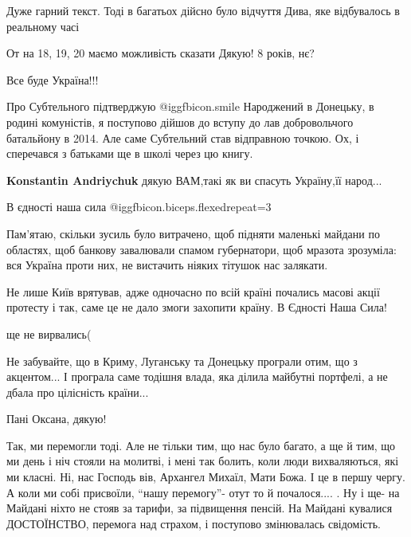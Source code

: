 \begin{itemize}
Дуже гарний текст.
Тоді в багатьох дійсно було відчуття Дива, яке відбувалось в реальному часі

От на 18, 19, 20 маємо можливість сказати Дякую! 8 років, нє?

Все буде Україна!!!


Про Субтельного підтверджую  @igg{fbicon.smile}  Народжений в Донецьку, в родині комуністів, я
поступово дійшов до вступу до лав добровольчого батальйону в 2014. Але саме
Субтельний став відправною точкою. Ох, і сперечався з батьками ще в школі через
цю книгу.

\textbf{Konstantin Andriychuk} дякую ВАМ,такі як ви спасуть Україну,її народ...

В єдності наша сила @igg{fbicon.biceps.flexed}{repeat=3} 


Пам'ятаю, скільки зусиль було витрачено, щоб підняти маленькі майдани по
областях, щоб банкову завалювали спамом губернатори, щоб мразота зрозуміла: вся
Україна проти них, не вистачить ніяких тітушок нас залякати.


Не лише Київ врятував, адже одночасно по всій країні почались масові акції
протесту і так, саме це не дало змоги захопити країну. В Єдності Наша Сила!

ще не вирвались(


Не забувайте, що в Криму, Луганську та Донецьку програли отим, що з акцентом...
І програла саме тодішня влада, яка ділила майбутні портфелі, а не дбала про
цілісність країни...

Пані Оксана, дякую!


Так, ми перемогли тоді. Але не тільки тим, що нас було багато, а ще й тим, що
ми день і ніч стояли на молитві, і мені так болить, коли люди вихваляються, які
ми класні. Ні, нас Господь вів, Архангел Михаїл, Мати Божа. І це в першу чергу.
А коли ми собі присвоїли, \enquote{нашу перемогу}- отут то й почалося.... . Ну і ще- на
Майдані ніхто не стояв за тарифи, за підвищення пенсій. На Майдані кувалися
ДОСТОЇНСТВО, перемога над страхом, і поступово змінювалась свідомість.


\end{itemize}
